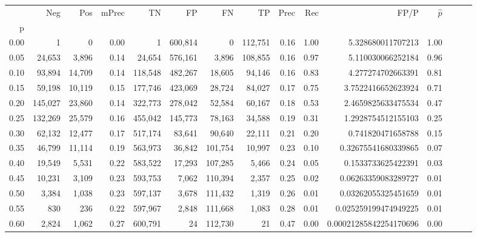 \begin{tabular}{rrrrrrrrrrrrrrr}
\toprule
{} &      Neg &     Pos & mPrec &       TN &       FP &       FN &       TP &  Prec &   Rec &                    FP/P & $\hat{p}$ \\
p    &          &         &       &          &          &          &          &       &       &                         &           \\
\midrule
0.00 &        1 &       0 &  0.00 &        1 &  600,814 &        0 &  112,751 &  0.16 &  1.00 &       5.328680011707213 &      1.00 \\
0.05 &   24,653 &   3,896 &  0.14 &   24,654 &  576,161 &    3,896 &  108,855 &  0.16 &  0.97 &       5.110030066252184 &      0.96 \\
0.10 &   93,894 &  14,709 &  0.14 &  118,548 &  482,267 &   18,605 &   94,146 &  0.16 &  0.83 &       4.277274702663391 &      0.81 \\
0.15 &   59,198 &  10,119 &  0.15 &  177,746 &  423,069 &   28,724 &   84,027 &  0.17 &  0.75 &      3.7522416652623924 &      0.71 \\
0.20 &  145,027 &  23,860 &  0.14 &  322,773 &  278,042 &   52,584 &   60,167 &  0.18 &  0.53 &      2.4659825633475534 &      0.47 \\
0.25 &  132,269 &  25,579 &  0.16 &  455,042 &  145,773 &   78,163 &   34,588 &  0.19 &  0.31 &      1.2928754512155103 &      0.25 \\
0.30 &   62,132 &  12,477 &  0.17 &  517,174 &   83,641 &   90,640 &   22,111 &  0.21 &  0.20 &       0.741820471658788 &      0.15 \\
0.35 &   46,799 &  11,114 &  0.19 &  563,973 &   36,842 &  101,754 &   10,997 &  0.23 &  0.10 &     0.32675541680339865 &      0.07 \\
0.40 &   19,549 &   5,531 &  0.22 &  583,522 &   17,293 &  107,285 &    5,466 &  0.24 &  0.05 &      0.1533733625422391 &      0.03 \\
0.45 &   10,231 &   3,109 &  0.23 &  593,753 &    7,062 &  110,394 &    2,357 &  0.25 &  0.02 &     0.06263359083289727 &      0.01 \\
0.50 &    3,384 &   1,038 &  0.23 &  597,137 &    3,678 &  111,432 &    1,319 &  0.26 &  0.01 &     0.03262055325451659 &      0.01 \\
0.55 &      830 &     236 &  0.22 &  597,967 &    2,848 &  111,668 &    1,083 &  0.28 &  0.01 &    0.025259199474949225 &      0.01 \\
0.60 &    2,824 &   1,062 &  0.27 &  600,791 &       24 &  112,730 &       21 &  0.47 &  0.00 &  0.00021285842254170696 &      0.00 \\

\end{tabular}
